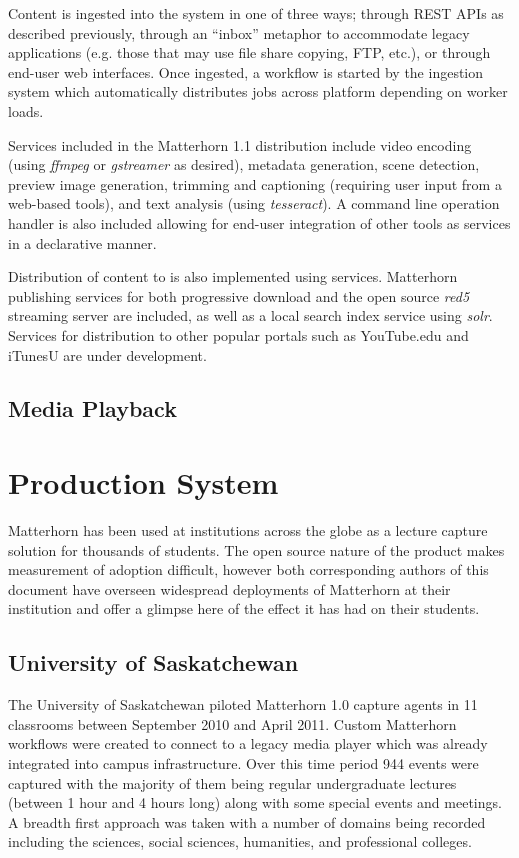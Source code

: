 \documentclass{sig-alternate}
\begin{document}
Content is ingested into the system in one of three ways; through REST APIs as described previously, through an ``inbox'' metaphor to accommodate legacy applications (e.g. those that may use file share copying, FTP, etc.), or through end-user web interfaces.  Once ingested, a workflow is started by the ingestion system which automatically distributes jobs across platform depending on worker loads.

Services included in the Matterhorn 1.1 distribution include video encoding (using \emph{ffmpeg} or \emph{gstreamer} as desired), metadata generation, scene detection, preview image generation, trimming and captioning (requiring user input from a web-based tools), and text analysis (using \emph{tesseract}).  A command line operation handler is also included allowing for end-user integration of other tools as services in a declarative manner.

Distribution of content to is also implemented using services.  Matterhorn publishing services for both progressive download and the open source \emph{red5} streaming server are included, as well as a local search index service using \emph{solr}.  Services for distribution to other popular portals such as YouTube.edu and iTunesU are under development.

\subsection{Media Playback}

\section{Production System}
Matterhorn has been used at institutions across the globe as a lecture capture solution for thousands of students.  The open source nature of the product makes measurement of adoption difficult, however both corresponding authors of this document have overseen widespread deployments of Matterhorn at their institution and offer a glimpse here of the effect it has had on their students.

\subsection{University of Saskatchewan}
The University of Saskatchewan piloted Matterhorn 1.0 capture agents in 11 classrooms between September 2010 and April 2011.  Custom Matterhorn workflows were created to connect to a legacy media player which was already integrated into campus infrastructure.
Over this time period 944 events were captured with the majority of them being regular undergraduate lectures (between 1 hour and 4 hours long) along with some special events and meetings.  A breadth first approach was taken with a number of domains being recorded including the sciences, social sciences, humanities, and professional colleges.
\end{document}
